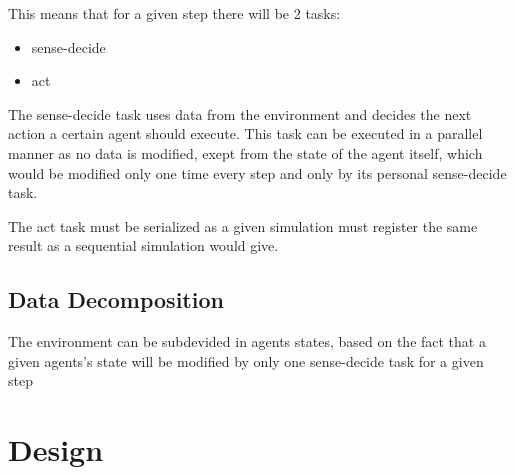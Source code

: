 \documentclass[12pt, a4paper]{report}
\begin{document}
This means that for a given step there will be 2 tasks:
\begin{itemize}
    \item sense-decide
    \item act
\end{itemize}

The sense-decide task uses data from the environment and decides
 the next action a certain agent should execute. This task can
 be executed in a parallel manner as no data is modified, exept
 from the state of the agent itself, which would be modified only
 one time every step and only by its personal sense-decide task.

The act task must be serialized as a given simulation must register
 the same result as a sequential simulation would give.

\section{Data Decomposition}
The environment can be subdevided in agents states, based
 on the fact that a given agents's state will be modified
 by only one sense-decide task for a given step

\chapter{Design}



\end{document}
